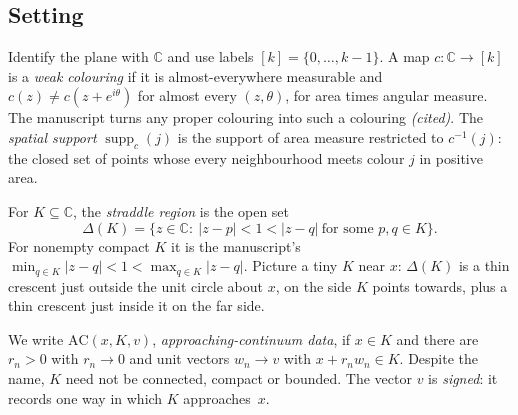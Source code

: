 \documentclass[11pt]{article}
\theoremstyle{definition}
\theoremstyle{remark}
\begin{document}
\subsection{Setting}

Identify the plane with $\mathbb C$ and use labels $[k]=\{0,\dots,k-1\}$.
A map $c:\mathbb C\to[k]$ is a \emph{weak colouring} if it is
almost-everywhere measurable and $c(z)\ne c(z+e^{i\theta})$ for almost
every $(z,\theta)$, for area times angular measure. The manuscript turns
any proper colouring into such a colouring \emph{(cited)}.
The \emph{spatial support} $\operatorname{supp}_c(j)$ is the support of area
measure restricted to $c^{-1}(j)$: the closed set of points whose every
neighbourhood meets colour $j$ in positive area.

For $K\subseteq\mathbb C$, the \emph{straddle region} is the open set
\[
  \Delta(K)=\{z\in\mathbb C:\ |z-p|<1<|z-q|\ \text{for some }p,q\in K\}.
\]
For nonempty compact $K$ it is the manuscript's
$\min_{q\in K}|z-q|<1<\max_{q\in K}|z-q|$. Picture a tiny $K$ near $x$:
$\Delta(K)$ is a thin crescent just outside the unit circle about $x$, on
the side $K$ points towards, plus a thin crescent just inside it on the far
side.

We write $\mathrm{AC}(x,K,v)$, \emph{approaching-continuum data}, if
$x\in K$ and there are $r_n>0$ with $r_n\to0$ and unit vectors $w_n\to v$
with $x+r_nw_n\in K$. Despite the name, $K$ need not be connected, compact
or bounded. The vector $v$ is \emph{signed}: it records one way in which
$K$ approaches~$x$.
\end{document}
